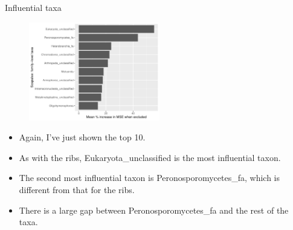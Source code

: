 \documentclass{beamer}
\begin{document}
\begin{frame}{Influential taxa}

  \begin{center}
    \begin{figure}
      \includegraphics[width=2.25in]{w_scapulae/families_scapula_PercIncMSE_barchart}
    \end{figure}
  \end{center}

  \vspace{0.05in}
  
  {\scriptsize
    \begin{itemize}
    \item Again, I've just shown the top 10.
    \item As with the ribs, Eukaryota\_unclassified is the most
      influential taxon.
    \item The second most influential taxon is Peronosporomycetes\_fa,
      which is different from that for the ribs.
    \item There is a large gap between Peronosporomycetes\_fa and the
      rest of the taxa.
  \end{itemize}
  }

\end{frame}
\end{document}
